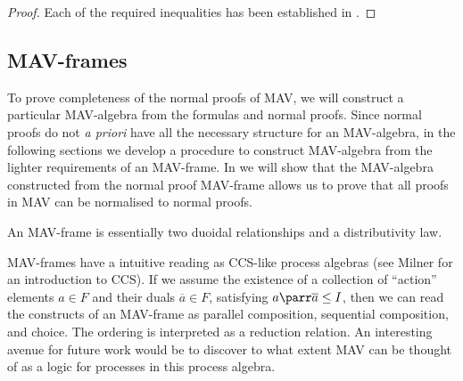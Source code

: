 
\begin{proof}
  Each of the required inequalities has been established in
  .
\end{proof}

\subsection{MAV-frames}

To prove completeness of the normal proofs of MAV, we will construct a
particular MAV-algebra from the formulas and normal proofs. Since
normal proofs do not {\it a priori} have all the necessary structure
for an MAV-algebra, in the following sections we develop a procedure
to construct MAV-algebra from the lighter requirements of an
MAV-frame. In  we will show that
the MAV-algebra constructed from the normal proof MAV-frame allows us
to prove that all proofs in MAV can be normalised to normal proofs.


\begin{remark}
  An MAV-frame is essentially two duoidal relationships and a
  distributivity law.
\end{remark}

\begin{remark}
  MAV-frames have a intuitive reading as CCS-like process algebras
  (see Milner \cite{milner89} for an introduction to CCS). If we
  assume the existence of a collection of ``action'' elements
  $a \in F$ and their duals $\overline{a} \in F$, satisfying
  $a \parr \overline{a} \leq I$, then we can read the constructs of an
  MAV-frame as parallel composition, sequential composition, and
  choice. The ordering is interpreted as a reduction relation. An
  interesting avenue for future work would be to discover to what
  extent MAV can be thought of as a logic for processes in this
  process algebra.
\end{remark}


